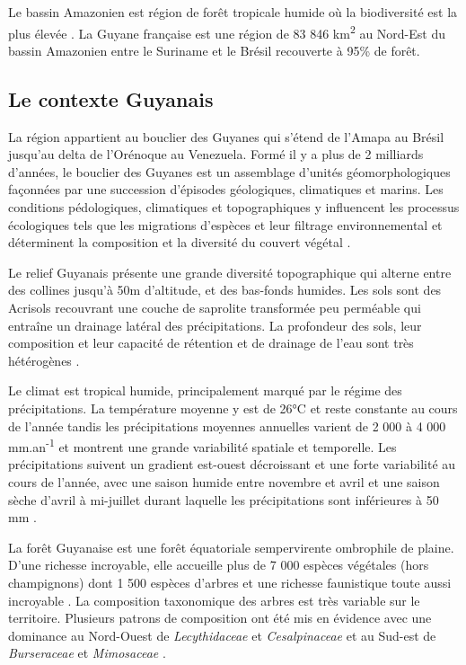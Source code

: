 \documentclass[
  11pt,
  french,
  A4paper,
  extrafontsizes,onecolumn,openright
  ]{memoir}
\begin{document}
Le bassin Amazonien est région de forêt tropicale humide où la
biodiversité est la plus élevée \autocite{Gentry1988}. La Guyane
française est une région de 83 846 km\textsuperscript{2} au Nord-Est du
bassin Amazonien entre le Suriname et le Brésil recouverte à 95\% de
forêt.

\subsection{Le contexte Guyanais}\label{le-contexte-guyanais}

La région appartient au bouclier des Guyanes qui s'étend de l'Amapa au
Brésil jusqu'au delta de l'Orénoque au Venezuela. Formé il y a plus de 2
milliards d'années, le bouclier des Guyanes est un assemblage d'unités
géomorphologiques façonnées par une succession d'épisodes géologiques,
climatiques et marins. Les conditions pédologiques, climatiques et
topographiques y influencent les processus écologiques tels que les
migrations d'espèces et leur filtrage environnemental et déterminent la
composition et la diversité du couvert végétal \autocite{Guitet2015}.

Le relief Guyanais présente une grande diversité topographique qui
alterne entre des collines jusqu'à 50m d'altitude, et des bas-fonds
humides. Les sols sont des Acrisols recouvrant une couche de saprolite
transformée peu perméable qui entraîne un drainage latéral des
précipitations. La profondeur des sols, leur composition et leur
capacité de rétention et de drainage de l'eau sont très hétérogènes
\autocites{Ferry2010}{Robert2003}.

Le climat est tropical humide, principalement marqué par le régime des
précipitations. La température moyenne y est de 26°C et reste constante
au cours de l'année tandis les précipitations moyennes annuelles varient
de 2 000 à 4 000 mm.an\textsuperscript{-1} et montrent une grande
variabilité spatiale et temporelle. Les précipitations suivent un
gradient est-ouest décroissant et une forte variabilité au cours de
l'année, avec une saison humide entre novembre et avril et une saison
sèche d'avril à mi-juillet durant laquelle les précipitations sont
inférieures à 50 mm \autocite{Wagner2011}.

La forêt Guyanaise est une forêt équatoriale sempervirente ombrophile de
plaine. D'une richesse incroyable, elle accueille plus de 7 000 espèces
végétales (hors champignons) dont 1 500 espèces d'arbres et une richesse
faunistique toute aussi incroyable \autocite{DeNoter2008}. La
composition taxonomique des arbres est très variable sur le territoire.
Plusieurs patrons de composition ont été mis en évidence avec une
dominance au Nord-Ouest de \emph{Lecythidaceae} et \emph{Cesalpinaceae}
et au Sud-est de \emph{Burseraceae} et \emph{Mimosaceae}
\autocite{Guitet2015}.
\end{document}
